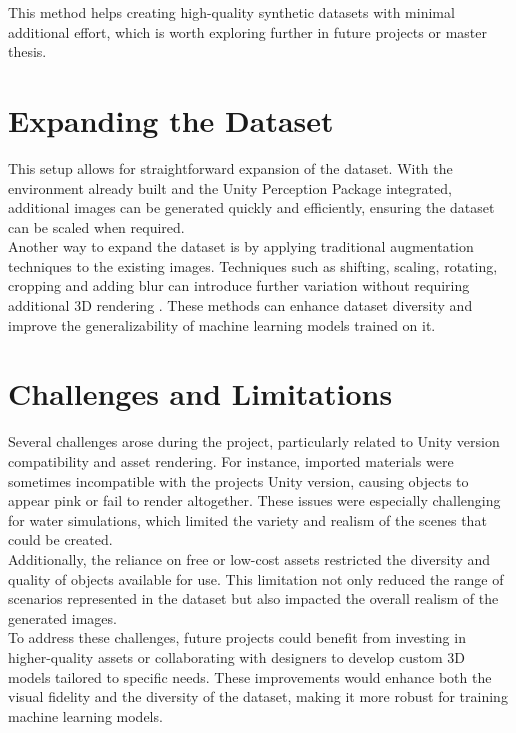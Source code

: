 \noindent This method helps creating high-quality synthetic datasets with minimal additional effort, which is worth exploring further in future projects or master thesis.


\section{Expanding the Dataset}
This setup allows for straightforward expansion of the dataset. With the environment already built and the Unity Perception Package \cite{unity-perception2022} integrated, additional images can be generated quickly and efficiently, ensuring the dataset can be scaled when required. \\

\noindent Another way to expand the dataset is by applying traditional augmentation techniques to the existing images. Techniques such as shifting, scaling, rotating, cropping and adding blur can introduce further variation without requiring additional 3D rendering \cite{nikolenko2021synthetic}. These methods can enhance dataset diversity and improve the generalizability of machine learning models trained on it.


\section{Challenges and Limitations}
Several challenges arose during the project, particularly related to Unity version compatibility and asset rendering. For instance, imported materials were sometimes incompatible with the projects Unity version, causing objects to appear pink or fail to render altogether. These issues were especially challenging for water simulations, which limited the variety and realism of the scenes that could be created.\\

\noindent Additionally, the reliance on free or low-cost assets restricted the diversity and quality of objects available for use. This limitation not only reduced the range of scenarios represented in the dataset but also impacted the overall realism of the generated images.\\

\noindent To address these challenges, future projects could benefit from investing in higher-quality assets or collaborating with designers to develop custom 3D models tailored to specific needs. These improvements would enhance both the visual fidelity and the diversity of the dataset, making it more robust for training machine learning models.



